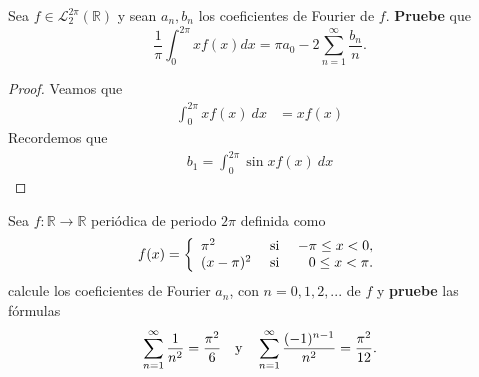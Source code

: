 \documentclass[12pt]{report}
\theoremstyle{largebreak}
\newcommand\cf[3]{\ensuremath{#1:#2\rightarrow#3}}
\begin{document}
    \begin{excer}
        Sea $f\in\mathcal{L}_2^{2\pi}(\mathbb{R})$ y sean $a_n,b_n$ los coeficientes de Fourier de $f$. \textbf{Pruebe} que
        \begin{equation*}
            \frac{1}{\pi}\int_0^{2\pi}xf(x)dx=\pi a_0-2\sum_{ n=1}^\infty \frac{b_n}{n}.
        \end{equation*}
    \end{excer}

    \begin{proof}
        Veamos que
        \begin{equation*}
            \begin{split}
                \int_0^{ 2\pi}xf(x)\:dx&=xf(x)
            \end{split}
        \end{equation*}
        Recordemos que
        \begin{equation*}
            \begin{split}
                b_1=\int_0^{2\pi}\sin xf(x)\:dx
            \end{split}
        \end{equation*}

    \end{proof}

    \begin{excer}
        Sea $\cf{f}{\mathbb{R}}{\mathbb{R}}$ periódica de periodo $2\pi$ definida como
        \begin{equation*}
            f(x)=\left\{
                \begin{array}{lcr}
                    \pi^2 & \textup{ si } & -\pi\leq x<0,\\
                    (x-\pi)^2 & \textup{ si } & 0\leq x <\pi.
                \end{array}
            \right.
        \end{equation*}
        calcule los coeficientes de Fourier $a_n$, con $n=0,1,2,...$ de $f$ y \textbf{pruebe} las fórmulas
        \begin{equation*}
            \sum_{ n=1}^\infty\frac{1}{n^2}=\frac{\pi^2}{6}\quad\textup{y}\quad\sum_{ n=1}^\infty\frac{(-1)^{ n-1}}{n^2}=\frac{\pi^2}{12}.
        \end{equation*}
    \end{excer}
\end{document}
